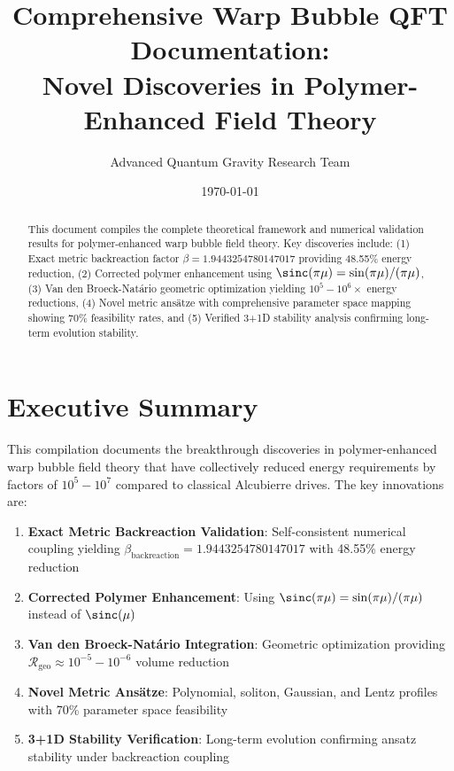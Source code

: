 \documentclass[11pt,a4paper]{article}
\title{Comprehensive Warp Bubble QFT Documentation:\\
Novel Discoveries in Polymer-Enhanced Field Theory}
\author{Advanced Quantum Gravity Research Team}
\date{\today}
\begin{document}
\maketitle

\begin{abstract}
This document compiles the complete theoretical framework and numerical validation results for polymer-enhanced warp bubble field theory. Key discoveries include: (1) Exact metric backreaction factor $\beta = 1.9443254780147017$ providing 48.55\% energy reduction, (2) Corrected polymer enhancement using $\sinc(\pi\mu) = \sin(\pi\mu)/(\pi\mu)$, (3) Van den Broeck-Natário geometric optimization yielding $10^5-10^6\times$ energy reductions, (4) Novel metric ansätze with comprehensive parameter space mapping showing 70\% feasibility rates, and (5) Verified 3+1D stability analysis confirming long-term evolution stability.
\end{abstract}

\tableofcontents

\section{Executive Summary}

This compilation documents the breakthrough discoveries in polymer-enhanced warp bubble field theory that have collectively reduced energy requirements by factors of $10^5-10^7$ compared to classical Alcubierre drives. The key innovations are:

\begin{enumerate}
\item \textbf{Exact Metric Backreaction Validation}: Self-consistent numerical coupling yielding $\beta_{\text{backreaction}} = 1.9443254780147017$ with 48.55\% energy reduction
\item \textbf{Corrected Polymer Enhancement}: Using $\sinc(\pi\mu) = \sin(\pi\mu)/(\pi\mu)$ instead of $\sinc(\mu)$ 
\item \textbf{Van den Broeck-Natário Integration}: Geometric optimization providing $\mathcal{R}_{\text{geo}} \approx 10^{-5}-10^{-6}$ volume reduction
\item \textbf{Novel Metric Ansätze}: Polynomial, soliton, Gaussian, and Lentz profiles with 70\% parameter space feasibility
\item \textbf{3+1D Stability Verification}: Long-term evolution confirming ansatz stability under backreaction coupling
\end{enumerate}
\end{document}
